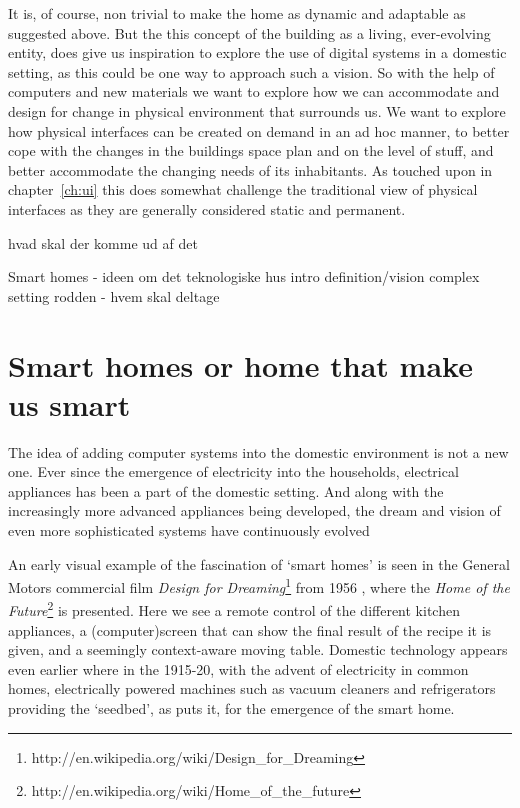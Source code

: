 It is, of course, non trivial to make the home as dynamic and adaptable as suggested above.
But the this concept of the building as a living, ever-evolving entity, does give us inspiration to explore the use of digital systems in a domestic setting, as this could be one way to approach such a vision.
So with the help of computers and new materials we want to explore how we can accommodate and design for change in physical environment that surrounds us.
We want to explore how physical interfaces can be created on demand in an ad hoc manner, to better cope with the changes in the buildings space plan and on the level of stuff, and better accommodate the changing needs of its inhabitants.
As touched upon in chapter~\ref{ch:ui} this does somewhat challenge the traditional view of physical interfaces as they are generally considered static and permanent.

hvad skal der komme ud af det

Smart homes - ideen om det teknologiske hus
intro
definition/vision
complex setting
rodden - hvem skal deltage 

\section{Smart homes or home that make us smart}
The idea of adding computer systems into the domestic environment is not a new one.
Ever since the emergence of electricity into the households, electrical appliances has been a part of the domestic setting.
And along with the increasingly more advanced appliances being developed, the dream and vision of even more sophisticated systems have continuously evolved

An early visual example of the fascination of `smart homes' is seen in the General Motors commercial film \emph{Design for Dreaming}\footnote{http://en.wikipedia.org/wiki/Design\_for\_Dreaming} from 1956 \citep{designfordreaming}, where the \emph{Home of the Future}\footnote{http://en.wikipedia.org/wiki/Home\_of\_the\_future} is presented.
Here we see a remote control of the different kitchen appliances, a (computer)screen that can show the final result of the recipe it is given, and a seemingly context-aware moving table.
Domestic technology appears even earlier where in the 1915-20, with the advent of electricity in common homes, electrically powered machines such as vacuum cleaners and refrigerators providing the `seedbed', as \citet{aldrich2003smart} puts it, for the emergence of the smart home.

